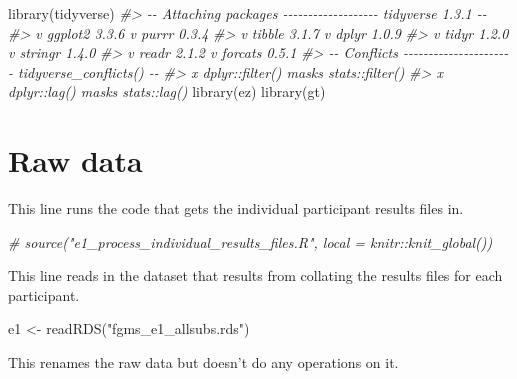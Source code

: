 \documentclass[
]{book}
\newenvironment{Shaded}{\begin{snugshade}}{\end{snugshade}}
\newcommand{\CommentTok}[1]{\textcolor[rgb]{0.56,0.35,0.01}{\textit{#1}}}
\newcommand{\FunctionTok}[1]{\textcolor[rgb]{0.00,0.00,0.00}{#1}}
\newcommand{\NormalTok}[1]{#1}
\newcommand{\OtherTok}[1]{\textcolor[rgb]{0.56,0.35,0.01}{#1}}
\newcommand{\StringTok}[1]{\textcolor[rgb]{0.31,0.60,0.02}{#1}}
\theoremstyle{definition}
\theoremstyle{definition}
\theoremstyle{definition}
\theoremstyle{definition}
\theoremstyle{remark}
\begin{document}
\begin{Shaded}
\begin{Highlighting}[]
\FunctionTok{library}\NormalTok{(tidyverse)}
\CommentTok{\#\textgreater{} {-}{-} Attaching packages {-}{-}{-}{-}{-}{-}{-}{-}{-}{-}{-}{-}{-}{-}{-}{-}{-}{-}{-} tidyverse 1.3.1 {-}{-}}
\CommentTok{\#\textgreater{} v ggplot2 3.3.6     v purrr   0.3.4}
\CommentTok{\#\textgreater{} v tibble  3.1.7     v dplyr   1.0.9}
\CommentTok{\#\textgreater{} v tidyr   1.2.0     v stringr 1.4.0}
\CommentTok{\#\textgreater{} v readr   2.1.2     v forcats 0.5.1}
\CommentTok{\#\textgreater{} {-}{-} Conflicts {-}{-}{-}{-}{-}{-}{-}{-}{-}{-}{-}{-}{-}{-}{-}{-}{-}{-}{-}{-}{-}{-} tidyverse\_conflicts() {-}{-}}
\CommentTok{\#\textgreater{} x dplyr::filter() masks stats::filter()}
\CommentTok{\#\textgreater{} x dplyr::lag()    masks stats::lag()}
\FunctionTok{library}\NormalTok{(ez)}
\FunctionTok{library}\NormalTok{(gt)}
\end{Highlighting}
\end{Shaded}

\hypertarget{raw-data}{%
\section{Raw data}\label{raw-data}}

This line runs the code that gets the individual participant results files in.

\begin{Shaded}
\begin{Highlighting}[]
\CommentTok{\# source("e1\_process\_individual\_results\_files.R", local = knitr::knit\_global())}
\end{Highlighting}
\end{Shaded}

This line reads in the dataset that results from collating the results files for each participant.

\begin{Shaded}
\begin{Highlighting}[]
\NormalTok{e1 }\OtherTok{\textless{}{-}} \FunctionTok{readRDS}\NormalTok{(}\StringTok{"fgms\_e1\_allsubs.rds"}\NormalTok{)}
\end{Highlighting}
\end{Shaded}

This renames the raw data but doesn't do any operations on it.
\end{document}
